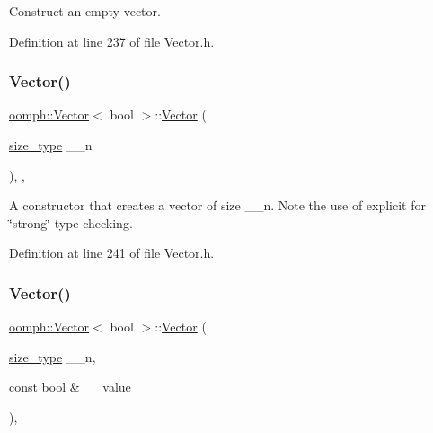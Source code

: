 Construct an empty vector. 



Definition at line 237 of file Vector.\+h.

\mbox{\label{classoomph_1_1Vector_3_01bool_01_4_ac7f720fa5a5c33441d5d6f483de27a7c}} 
\subsubsection{\texorpdfstring{Vector()}{Vector()}\hspace{0.1cm}{\footnotesize\ttfamily [3/5]}}
{\footnotesize\ttfamily \hyperlink{classoomph_1_1Vector}{oomph\+::\+Vector}$<$ bool $>$\+::\hyperlink{classoomph_1_1Vector}{Vector} (\begin{DoxyParamCaption}\item[{\hyperlink{classoomph_1_1Vector_3_01bool_01_4_a016848fc2d6e301e64a0209ade793732}{size\+\_\+type}}]{\+\_\+\+\_\+n }\end{DoxyParamCaption})\hspace{0.3cm}{\ttfamily [inline]}, {\ttfamily [explicit]}, {\ttfamily [private]}}



A constructor that creates a vector of size \+\_\+\+\_\+n. Note the use of explicit for \char`\"{}strong\char`\"{} type checking. 



Definition at line 241 of file Vector.\+h.

\mbox{\label{classoomph_1_1Vector_3_01bool_01_4_a9be6c35ffa4cd81c0f046be9b5adc87d}} 
\subsubsection{\texorpdfstring{Vector()}{Vector()}\hspace{0.1cm}{\footnotesize\ttfamily [4/5]}}
{\footnotesize\ttfamily \hyperlink{classoomph_1_1Vector}{oomph\+::\+Vector}$<$ bool $>$\+::\hyperlink{classoomph_1_1Vector}{Vector} (\begin{DoxyParamCaption}\item[{\hyperlink{classoomph_1_1Vector_3_01bool_01_4_a016848fc2d6e301e64a0209ade793732}{size\+\_\+type}}]{\+\_\+\+\_\+n,  }\item[{const bool \&}]{\+\_\+\+\_\+value }\end{DoxyParamCaption})\hspace{0.3cm}{\ttfamily [inline]}, {\ttfamily [private]}}



